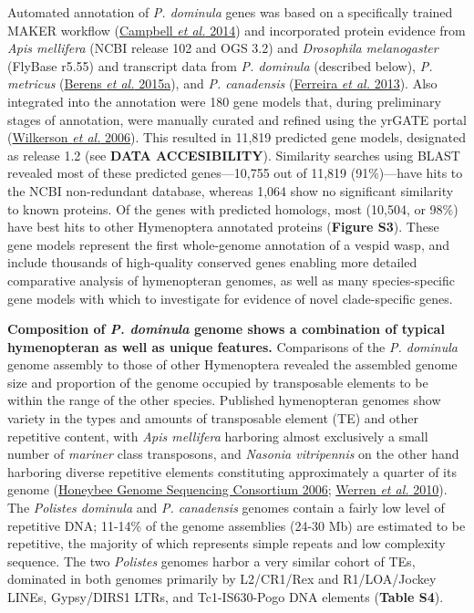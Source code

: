 \documentclass[]{article}
\begin{document}
Automated annotation of \emph{P. dominula} genes was based on a
specifically trained MAKER workflow
(\protect\hyperlink{ux5fENREFux5f6}{Campbell \emph{et al.} 2014}) and
incorporated protein evidence from \emph{Apis mellifera} (NCBI release
102 and OGS 3.2) and \emph{Drosophila} \emph{melanogaster} (FlyBase
r5.55) and transcript data from \emph{P. dominula} (described below),
\emph{P. metricus} (\protect\hyperlink{ux5fENREFux5f2}{Berens \emph{et
al.} 2015a}), and \emph{P. canadensis}
(\protect\hyperlink{ux5fENREFux5f10}{Ferreira \emph{et al.} 2013}). Also
integrated into the annotation were 180 gene models that, during
preliminary stages of annotation, were manually curated and refined
using the yrGATE portal (\protect\hyperlink{ux5fENREFux5f73}{Wilkerson
\emph{et al.} 2006}). This resulted in 11,819 predicted gene models,
designated as release 1.2 (see \textbf{DATA ACCESIBILITY}). Similarity
searches using BLAST revealed most of these predicted genes---10,755 out
of 11,819 (91\%)---have hits to the NCBI non-redundant database, whereas
1,064 show no significant similarity to known proteins. Of the genes
with predicted homologs, most (10,504, or 98\%) have best hits to other
Hymenoptera annotated proteins (\textbf{Figure S3}). These gene models
represent the first whole-genome annotation of a vespid wasp, and
include thousands of high-quality conserved genes enabling more detailed
comparative analysis of hymenopteran genomes, as well as many
species-specific gene models with which to investigate for evidence of
novel clade-specific genes.

\textbf{Composition of \emph{P. dominula} genome shows a combination of
typical hymenopteran as well as unique features.} Comparisons of the
\emph{P. dominula} genome assembly to those of other Hymenoptera
revealed the assembled genome size and proportion of the genome occupied
by transposable elements to be within the range of the other species.
Published hymenopteran genomes show variety in the types and amounts of
transposable element (TE) and other repetitive content, with \emph{Apis
mellifera} harboring almost exclusively a small number of \emph{mariner}
class transposons, and \emph{Nasonia vitripennis} on the other hand
harboring diverse repetitive elements constituting approximately a
quarter of its genome (\protect\hyperlink{ux5fENREFux5f20}{Honeybee
Genome Sequencing Consortium 2006};
\protect\hyperlink{ux5fENREFux5f70}{Werren \emph{et al.} 2010}). The
\emph{Polistes dominula} and \emph{P. canadensis} genomes contain a
fairly low level of repetitive DNA; 11-14\% of the genome assemblies
(24-30 Mb) are estimated to be repetitive, the majority of which
represents simple repeats and low complexity sequence. The two
\emph{Polistes} genomes harbor a very similar cohort of TEs, dominated
in both genomes primarily by L2/CR1/Rex and R1/LOA/Jockey LINEs,
Gypsy/DIRS1 LTRs, and Tc1-IS630-Pogo DNA elements (\textbf{Table S4}).
\end{document}
